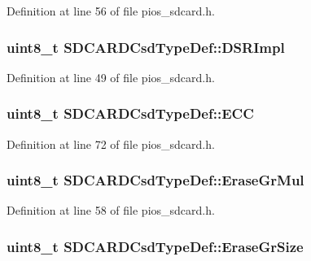 \-Definition at line 56 of file pios\-\_\-sdcard.\-h.

\hypertarget{group___p_i_o_s___s_d_c_a_r_d_ga650841d99b60792a21a853a6a2c541d9}{
\subsubsection[{\-D\-S\-R\-Impl}]{\setlength{\rightskip}{0pt plus 5cm}uint8\-\_\-t {\bf \-S\-D\-C\-A\-R\-D\-Csd\-Type\-Def\-::\-D\-S\-R\-Impl}}}\label{group___p_i_o_s___s_d_c_a_r_d_ga650841d99b60792a21a853a6a2c541d9}


\-Definition at line 49 of file pios\-\_\-sdcard.\-h.

\hypertarget{group___p_i_o_s___s_d_c_a_r_d_ga5e147c22c2995b291b7a5ea1a600c5a0}{
\subsubsection[{\-E\-C\-C}]{\setlength{\rightskip}{0pt plus 5cm}uint8\-\_\-t {\bf \-S\-D\-C\-A\-R\-D\-Csd\-Type\-Def\-::\-E\-C\-C}}}\label{group___p_i_o_s___s_d_c_a_r_d_ga5e147c22c2995b291b7a5ea1a600c5a0}


\-Definition at line 72 of file pios\-\_\-sdcard.\-h.

\hypertarget{group___p_i_o_s___s_d_c_a_r_d_gaaba9c6de9483b08af94542e59c76107e}{
\subsubsection[{\-Erase\-Gr\-Mul}]{\setlength{\rightskip}{0pt plus 5cm}uint8\-\_\-t {\bf \-S\-D\-C\-A\-R\-D\-Csd\-Type\-Def\-::\-Erase\-Gr\-Mul}}}\label{group___p_i_o_s___s_d_c_a_r_d_gaaba9c6de9483b08af94542e59c76107e}


\-Definition at line 58 of file pios\-\_\-sdcard.\-h.

\hypertarget{group___p_i_o_s___s_d_c_a_r_d_ga23248a27a48bd1603990d88bc6e6825b}{
\subsubsection[{\-Erase\-Gr\-Size}]{\setlength{\rightskip}{0pt plus 5cm}uint8\-\_\-t {\bf \-S\-D\-C\-A\-R\-D\-Csd\-Type\-Def\-::\-Erase\-Gr\-Size}}}\label{group___p_i_o_s___s_d_c_a_r_d_ga23248a27a48bd1603990d88bc6e6825b}


